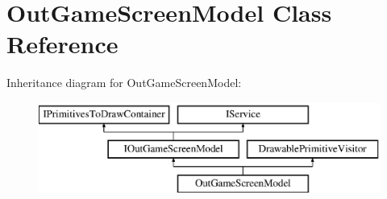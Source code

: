\hypertarget{classOutGameScreenModel}{}\section{Out\+Game\+Screen\+Model Class Reference}
\label{classOutGameScreenModel}
Inheritance diagram for Out\+Game\+Screen\+Model\+:\begin{figure}[H]
\begin{center}
\leavevmode
\includegraphics[height=3.000000cm]{classOutGameScreenModel}
\end{center}
\end{figure}
